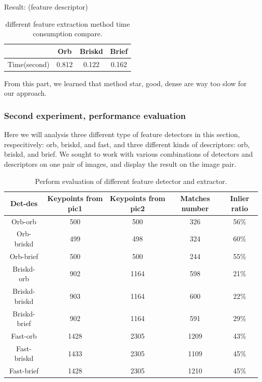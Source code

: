 \documentclass[10pt,conference,compsocconf]{IEEEtran}
\newcommand\tabhead[1]{\small\textbf{#1}}
\begin{document}
Result: (feature descriptor)\\

\begin{table}[!ht]
  \centering
  \begin{tabular}{|c|c|c|c|}
    \hline
     & Orb&Briskd&Brief\\
    \hline
    Time(second)&0.812&0.122&0.162 \\
    \hline
  \end{tabular}
  \caption{different feature extraction method time consumption compare.}
\end{table}

From this part, we learned that method star, good, dense are way too slow for our approach.\\

\subsubsection{Second experiment, performance evaluation}

Here we will analysis three different type of feature detectors in this section, respecitively: orb, briskd, and fast, and three different kinds of descriptors: orb, briskd, and brief. We sought to work with various combinations of detectors and descriptors on one pair of images, and display the result on the image pair. \\



\begin{table}[!ht]
  \centering
  \begin{tabular}{|c|c|c|c|c|}
    \hline
    \tabhead{Det-des}&
    \multicolumn{1}{|p{0.15\columnwidth}|}{\centering\tabhead{Keypoints from pic1}} &
    \multicolumn{1}{|p{0.15\columnwidth}|}{\centering\tabhead{Keypoints from pic2}}&
    \multicolumn{1}{|p{0.15\columnwidth}|}{\centering\tabhead{Matches number}}&
    \multicolumn{1}{|p{0.1\columnwidth}|}{\centering\tabhead{Inlier ratio}} \\
    \hline
    Orb-orb & 500 & 500 & 326 & 56\%\\
    \hline
    Orb-briskd & 499 & 498 & 324 & 60\%\\
    \hline
    Orb-brief & 500 & 500 & 244 &	55\%\\
    \hline
    Briskd-orb &	902 &	1164 &	598 &	21\%\\
    \hline
    Briskd-briskd &	903 &	1164 &	600 &	22\%\\
    \hline
    Briskd-brief &	902 &	1164 &	591 &	29\%\\
    \hline
    Fast-orb &	1428 &	2305 &	1209 &	43\%\\
    \hline
    Fast-briskd &	1433 &	2305	 &1109 &	45\%\\
    \hline
    Fast-brief &	1428 &	2305 &	1210 &	45\%\\
    \hline
  \end{tabular}
  \caption{Perform evaluation of different feature detector and extractor.}
  \label{tab:table1}
\end{table}
\end{document}
